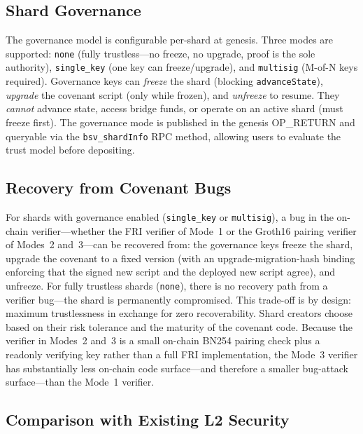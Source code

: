 \documentclass[11pt,twocolumn]{article}
\begin{document}
\subsection{Shard Governance}

The governance model is configurable per-shard at genesis. Three modes are supported: \texttt{none} (fully trustless---no freeze, no upgrade, proof is the sole authority), \texttt{single\_key} (one key can freeze/upgrade), and \texttt{multisig} (M-of-N keys required). Governance keys can \emph{freeze} the shard (blocking \texttt{advanceState}), \emph{upgrade} the covenant script (only while frozen), and \emph{unfreeze} to resume. They \emph{cannot} advance state, access bridge funds, or operate on an active shard (must freeze first). The governance mode is published in the genesis OP\_RETURN and queryable via the \texttt{bsv\_shardInfo} RPC method, allowing users to evaluate the trust model before depositing.

\subsection{Recovery from Covenant Bugs}

For shards with governance enabled (\texttt{single\_key} or \texttt{multisig}), a bug in the on-chain verifier---whether the FRI verifier of Mode~1 or the Groth16 pairing verifier of Modes~2 and~3---can be recovered from: the governance keys freeze the shard, upgrade the covenant to a fixed version (with an upgrade-migration-hash binding enforcing that the signed new script and the deployed new script agree), and unfreeze. For fully trustless shards (\texttt{none}), there is no recovery path from a verifier bug---the shard is permanently compromised. This trade-off is by design: maximum trustlessness in exchange for zero recoverability. Shard creators choose based on their risk tolerance and the maturity of the covenant code. Because the verifier in Modes~2 and~3 is a small on-chain BN254 pairing check plus a readonly verifying key rather than a full FRI implementation, the Mode~3 verifier has substantially less on-chain code surface---and therefore a smaller bug-attack surface---than the Mode~1 verifier.

\subsection{Comparison with Existing L2 Security}
\end{document}

